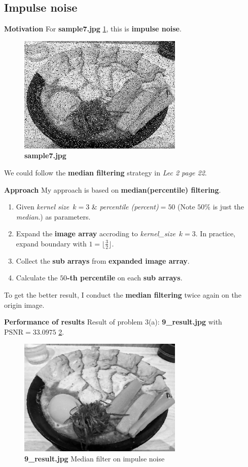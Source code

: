 \subsection{Impulse noise}
\textbf{Motivation}
For \textbf{sample7.jpg} \cref{fig3i}, this is \textbf{impulse noise}.
\begin{figure}
  \centering
  \includegraphics[width=0.7\textwidth]{image/sample7.jpg}
  \caption{\textbf{sample7.jpg}}
  \label{fig3i}
\end{figure}
We could follow the \textbf{median filtering} strategy in \textit{Lec 2 page 22}.

\textbf{Approach}
My approach is based on \textbf{median(percentile) filtering}. 
\begin{enumerate}
    \item Given \emph{kernel size}~\(k=3\) \& \emph{percentile (percent)}\(=50\) (Note \(50\)\% is just the \emph{median}.) as parameters.
    \item Expand the \textbf{image array} accroding to \emph{kernel\_size}~\(k=3\). In practice, expand boundary with \(1=\lfloor \frac{3}{2} \rfloor\).
    \item Collect the \textbf{sub arrays} from \textbf{expanded image array}.
    \item Calculate the $50$\textbf{-th percentile} on each \textbf{sub arrays}.
\end{enumerate}
To get the better result, I conduct the \textbf{median filtering} \alert{twice} again on the origin image.

\textbf{Performance of results}
Result of problem 3(a): \textbf{9\_result.jpg} with $\mbox{PSNR}=33.0975$ \cref{fig3a_2}.
\begin{figure}
  \centering
  \includegraphics[width=0.7\textwidth]{image/9_result.jpg}
  \caption{\textbf{9\_result.jpg} Median filter on impulse noise}
  \label{fig3a_2}
\end{figure}

